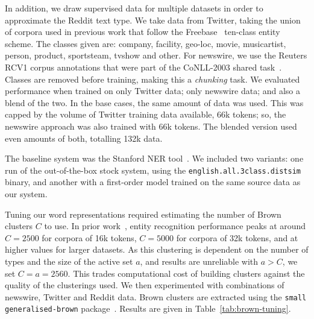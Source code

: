 \documentclass[sigconf]{acmart}
\begin{document}
In addition, we draw supervised data for multiple datasets in order to approximate the Reddit text type.
We take data from Twitter, taking the union of corpora used in previous work that follow the Freebase~\cite{bollacker2008freebase} ten-class entity scheme.
The classes given are: company, facility, geo-loc, movie, musicartist, person, product, sportsteam, tvshow and other.
For newswire, we use the Reuters RCV1 corpus annotations that were part of the CoNLL-2003 shared task~\cite{tjong2003introduction}.
Classes are removed before training, making this a \emph{chunking} task.
We evaluated performance when trained on only Twitter data; only newswire data; and also a blend of the two.
In the base cases, the same amount of data was used.
This was capped by the volume of Twitter training data available, 66k tokens; so, the newswire approach was also trained with 66k tokens.
The blended version used even amounts of both, totalling 132k data.

The baseline system was the Stanford NER tool~\cite{finkel2005incorporating}.
We included two variants: one run of the out-of-the-box stock system, using the {\tt \small english.all.3class.distsim} binary, and another with a first-order model trained on the same source data as our system.

Tuning our word representations required estimating the number of Brown clusters $C$ to use.
In prior work~\cite{derczynski2015tune}, entity recognition performance %
peaks at around $C=2500$ for corpora of 16k tokens, $C=5000$ for corpora of 32k tokens, and at higher values for larger datasets.
As this clustering is dependent on the number of types and the size of the active set $a$, and results are unreliable with $a>C$, we set $C = a = 2560$.
This trades computational cost of building clusters against the quality of the clusterings used.
We then experimented with combinations of newswire, Twitter and Reddit data.
Brown clusters are extracted using the {\tt small generalised-brown} package~\cite{sean_chester_2015_33758}.
Results are given in Table~\ref{tab:brown-tuning}.
\end{document}
